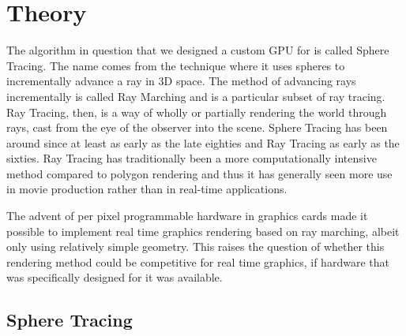 \chapter{Theory}

	The algorithm in question that we designed a custom GPU for is called
	Sphere Tracing\cite{Hart1996}. The name comes from the technique where it uses spheres to
	incrementally advance a ray in 3D space. The method of advancing rays
	incrementally is called Ray Marching and is a particular subset of ray
	tracing.\cite{Whitted1980} Ray Tracing, then, is a way of wholly or
	partially rendering the world through rays, cast from the eye of the
	observer into the scene. Sphere Tracing has been around since at least as
	early as the late eighties and Ray Tracing as early as the
	sixties\cite{Hart1989,Appel1968}. Ray Tracing has traditionally been a 
	more computationally intensive method compared to polygon
	rendering\cite{Wylie1967} and thus it has generally seen more use in movie  
	production rather than in real-time applications.\cite{ref_needed?} 
	
	The advent of per pixel programmable hardware in graphics cards made it 
	possible to implement real time graphics rendering based on ray	marching, 
	albeit only using relatively simple geometry. This raises the question of 
	whether this rendering method could be competitive for real time graphics, 
	if hardware that was specifically designed for it was available.
	
		
	\section{Sphere Tracing} 

